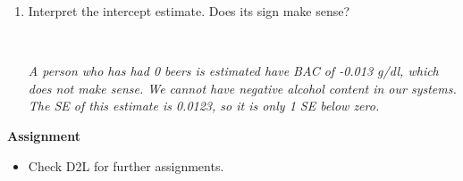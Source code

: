 \begin{enumerate}
\begin{enumerate}
\begin{key}
  {\it Each beer a person drinks is estimated to increase BAC by 0.018 g/dl}
\end{key}

\item Interpret the intercept estimate. Does its sign make sense?
\begin{students}
 \vspace{2cm}\\
\end{students}

\begin{key}
  {\it A person who has had 0 beers is estimated have BAC of -0.013
    g/dl, which does not make sense. We cannot have negative alcohol
    content in our systems. The SE of this estimate is 0.0123, so it
    is only 1 SE below zero.}
\end{key}
\end{enumerate}\vspace*{\fill}




\end{enumerate}
 



\noindent
{\bf Assignment} \vspace{-.2in}
\begin{itemize}
\item Check D2L for further assignments. 
\end{itemize}


  
 